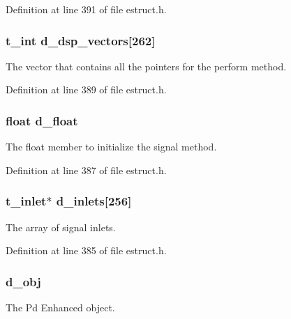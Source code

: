 Definition at line 391 of file estruct.\-h.

\hypertarget{struct__edspobj_a6c9361ef0820022b61cd7894d641c029}{
\subsubsection[{d\-\_\-dsp\-\_\-vectors}]{\setlength{\rightskip}{0pt plus 5cm}t\-\_\-int d\-\_\-dsp\-\_\-vectors\mbox{[}262\mbox{]}}}\label{struct__edspobj_a6c9361ef0820022b61cd7894d641c029}
The vector that contains all the pointers for the perform method. 

Definition at line 389 of file estruct.\-h.

\hypertarget{struct__edspobj_aaa8c8ad1277112523fd01b5058e0fcb5}{
\subsubsection[{d\-\_\-float}]{\setlength{\rightskip}{0pt plus 5cm}float d\-\_\-float}}\label{struct__edspobj_aaa8c8ad1277112523fd01b5058e0fcb5}
The float member to initialize the signal method. 

Definition at line 387 of file estruct.\-h.

\hypertarget{struct__edspobj_af58ea0594fc028861443f36dc2d1ebf4}{
\subsubsection[{d\-\_\-inlets}]{\setlength{\rightskip}{0pt plus 5cm}t\-\_\-inlet$\ast$ d\-\_\-inlets\mbox{[}256\mbox{]}}}\label{struct__edspobj_af58ea0594fc028861443f36dc2d1ebf4}
The array of signal inlets. 

Definition at line 385 of file estruct.\-h.

\hypertarget{struct__edspobj_a987087c8b9df0fa2ae99bd44ab53dab9}{
\subsubsection[{d\-\_\-obj}]{ d\-\_\-obj}}\label{struct__edspobj_a987087c8b9df0fa2ae99bd44ab53dab9}
The Pd Enhanced object. 

